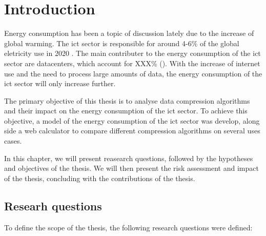 

\chapter{Introduction}
\label{chapter:introduction}

\begin{introduction}

Energy consumption has been a topic of discussion lately due to the increase of global warming. The \ac{ict} sector is responsible for around 4-6\% of the global eletricity use in 2020 \citet{UK-parliament}. The main contributer to the energy consumption of the \ac{ict} sector are datacenters, which account for XXX\% (\citet{check source}). With the increase of internet use and the need to process large amounts of data, the energy consumption of the \ac{ict} sector will only increase further.

The primary objective of this thesis is to analyse data compression algorithms and their impact on the energy consumption of the \ac{ict} sector.
To achieve this objective, a model of the energy consumption of the \ac{ict} sector was develop, along side a web calculator to compare different compression algorithms on several uses cases. 

In this chapter, we will present reasearch questions, followed by the hypotheses and objectives of the thesis. We will then present the risk assessment and impact of the thesis, concluding with the contributions of the thesis. 

\end{introduction}

\section{Researh questions}
\label{section:research_questions}

To define the scope of the thesis, the following research questions were defined:

